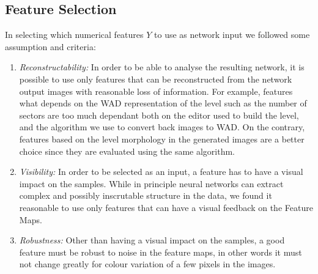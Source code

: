 \subsection{Feature Selection}
In selecting which numerical features $Y$ to use as network input we followed some assumption and criteria:
\begin{enumerate}
	\item \textit{Reconstructability:} In order to be able to analyse the resulting network, it is possible to use only features that can be reconstructed from the network output images with reasonable loss of information. For example, features what depends on the WAD representation of the level such as the number of sectors are too much dependant both on the editor used to build the level, and the algorithm we use to convert back images to WAD. On the contrary, features based on the level morphology in the generated images are a better choice since they are evaluated using the same algorithm.
	\item \textit{Visibility:} In order to be selected as an input, a feature has to have a visual impact on the samples. While in principle neural networks can extract complex and possibly inscrutable structure in the data, we found it reasonable to use only features that can have a visual feedback on the Feature Maps.
	\item \textit{Robustness:} Other than having a visual impact on the samples, a good feature must be robust to noise in the feature maps, in other words it must not change greatly for colour variation of a few pixels in the images. 
\end{enumerate}


